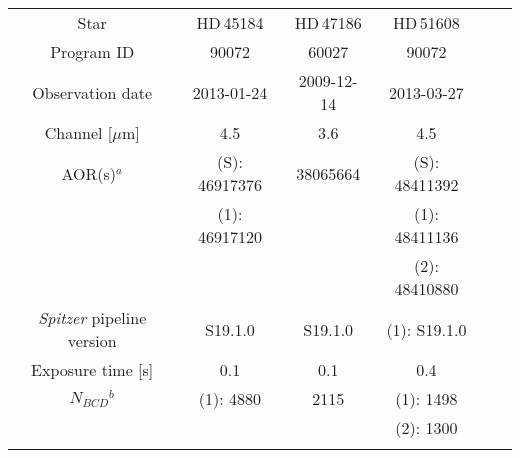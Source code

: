 \documentclass[traditabstract]{aa}
\begin{document}
\begin{appendix}
\begin{table*}
\begin{center}
{\scriptsize
\label{tab:targets}
\begin{tabular}{cccccc}
\hline\noalign {\smallskip}
Star &  HD\,45184 & HD\,47186 & HD\,51608      \\ \noalign {\smallskip}
\hline \noalign {\smallskip}  
Program ID                                                          & 90072                                & 60027                          &  90072                       \\ \noalign {\smallskip} 
Observation date                                                 & 2013-01-24                       & 2009-12-14                 &  2013-03-27                \\ \noalign {\smallskip} 
Channel       [$\mu$m]                                         & 4.5                                    & 3.6                              & 4.5                              \\ \noalign {\smallskip} 
AOR(s)$^a$                                                        & (S): 46917376                   & 38065664                   & (S): 48411392             \\ \noalign {\smallskip}                                                                                      
                                                                           & (1): 46917120                   &                                      & (1): 48411136             \\ \noalign {\smallskip} 
                                                                           &                                            &                                    & (2): 48410880                \\ \noalign {\smallskip} 
{\it Spitzer} pipeline version                               & S19.1.0                                 & S19.1.0                       & (1): S19.1.0                  \\ \noalign {\smallskip}     
Exposure time [s]                                               & 0.1                                       & 0.1                               & 0.4                               \\ \noalign {\smallskip} 
$N_{BCD}$$^b$                                                & (1): 4880                               & 2115                      & (1): 1498                    \\ \noalign {\smallskip} 
                                                                           &                                            &                                   & (2): 1300                            \\ \noalign {\smallskip} 
$$
\end{tabular}}
\end{center}
\end{table*}
\end{appendix}
\end{document}
